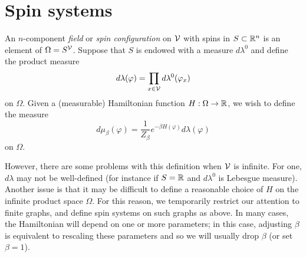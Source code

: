 


\section{Spin systems}

An $n$-component \emph{field} or \emph{spin configuration} on $\mathcal{V}$
with spins in $S \subset {\mathbb R}^n$ is an element of $\Omega = S^{\mathcal{V}}$.
Suppose that $S$ is endowed with a measure $d\lambda^0$ and define the product measure
\begin{equation}
d\lambda(\varphi) = \prod_{x\in\mathcal{V}} d\lambda^0(\varphi_x)
\end{equation}
on $\Omega$.
Given a (measurable) Hamiltonian function $H : \Omega \rightarrow {\mathbb R}$, we wish to define the measure
\begin{equation}
d\mu_\beta(\varphi)
  =
\frac{1}{Z_\beta} e^{-\beta H(\varphi)} d\lambda(\varphi)
\end{equation}
on $\Omega$.

However, there are some problems with this definition when $\mathcal{V}$ is infinite. For one, $d\lambda$ may not be well-defined (for instance if
$S = {\mathbb R}$ and $d\lambda^0$ is Lebesgue measure). Another issue is that it may be difficult to define a reasonable choice of $H$ on the infinite product space
$\Omega$. For this reason, we temporarily restrict our attention to finite graphs, and define spin systems on such graphs as above. In many cases, the Hamiltonian will depend on one or more parameters; in this case, adjusting $\beta$ is equivalent to rescaling these parameters and so we will usually drop $\beta$
(or set $\beta = 1$).

